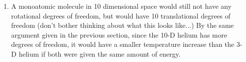 \begin{enumerate}
    \item A monoatomic molecule in 10 dimensional space would still not have any rotational degrees of freedom, but would have 10 translational degrees of freedom (don't bother thinking about what this looks like...) By the same argument given in the previous section, since the 10-D helium has more degrees of freedom, it would have a smaller temperature increase than the 3-D helium if both were given the same amount of energy. 
\end{enumerate}